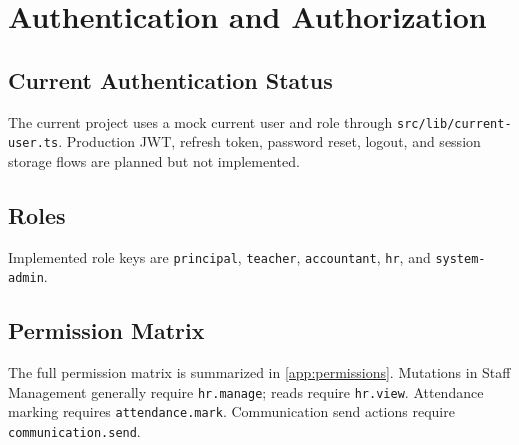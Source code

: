 \chapter{Authentication and Authorization}
\section{Current Authentication Status}
The current project uses a mock current user and role through \texttt{src/lib/current-user.ts}. Production JWT, refresh token, password reset, logout, and session storage flows are planned but not implemented.




\section{Roles}
Implemented role keys are \texttt{principal}, \texttt{teacher}, \texttt{accountant}, \texttt{hr}, and \texttt{system-admin}.

\section{Permission Matrix}
The full permission matrix is summarized in \cref{app:permissions}. Mutations in Staff Management generally require \texttt{hr.manage}; reads require \texttt{hr.view}. Attendance marking requires \texttt{attendance.mark}. Communication send actions require \texttt{communication.send}.
